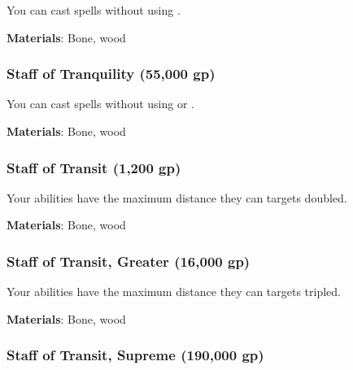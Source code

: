 You can cast spells without using .



\vspace{0.25em}
\textbf{Materials}: Bone, wood


\lowercase{\hypertarget{item:Staff of Tranquility}{}}\label{item:Staff of Tranquility}
\hypertarget{item:Staff of Tranquility}{\subsubsection{Staff of Tranquility\hfill{} (55,000 gp)}}

You can cast spells without using  or .



\vspace{0.25em}
\textbf{Materials}: Bone, wood


\lowercase{\hypertarget{item:Staff of Transit}{}}\label{item:Staff of Transit}
\hypertarget{item:Staff of Transit}{\subsubsection{Staff of Transit\hfill{} (1,200 gp)}}

Your  abilities have the maximum distance they can  targets doubled.



\vspace{0.25em}
\textbf{Materials}: Bone, wood


\lowercase{\hypertarget{item:Staff of Transit, Greater}{}}\label{item:Staff of Transit, Greater}
\hypertarget{item:Staff of Transit, Greater}{\subsubsection{Staff of Transit, Greater\hfill{} (16,000 gp)}}

Your  abilities have the maximum distance they can  targets tripled.



\vspace{0.25em}
\textbf{Materials}: Bone, wood


\lowercase{\hypertarget{item:Staff of Transit, Supreme}{}}\label{item:Staff of Transit, Supreme}
\hypertarget{item:Staff of Transit, Supreme}{\subsubsection{Staff of Transit, Supreme\hfill{} (190,000 gp)}}

